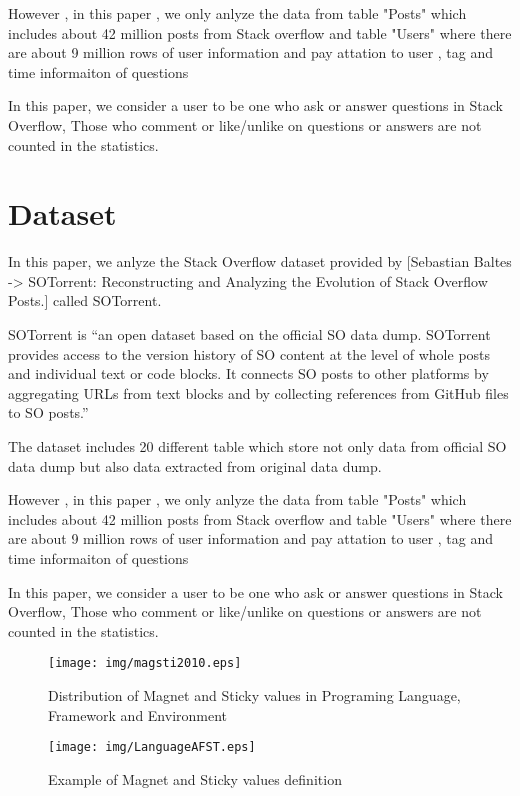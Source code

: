 \documentclass[conference]{IEEEtran}
\begin{document}
However , in this paper , we only anlyze the data from table "Posts" which includes about 42 million posts from Stack overflow and table "Users" where there are about 9 million rows of user information and pay attation to user , tag and time informaiton of questions

In this paper, we consider a user to be one who ask or answer questions in Stack Overflow, Those who comment or like/unlike on questions or answers are not counted in the statistics.

\section{Dataset}
In this paper, we anlyze the Stack Overflow dataset provided by [Sebastian Baltes -> SOTorrent: Reconstructing and Analyzing the Evolution of Stack Overflow Posts.] called SOTorrent. 

SOTorrent is “an open dataset based on the official SO data dump. SOTorrent provides access to the version history of SO content at the level of whole posts and individual text or code blocks. It connects SO posts to other platforms by aggregating URLs from text blocks and by collecting references from GitHub files to SO posts.”

The dataset includes 20 different table which store not only data from official SO data dump but also data extracted from original data dump.

However , in this paper , we only anlyze the data from table "Posts" which includes about 42 million posts from Stack overflow and table "Users" where there are about 9 million rows of user information and pay attation to user , tag and time informaiton of questions

In this paper, we consider a user to be one who ask or answer questions in Stack Overflow, Those who comment or like/unlike on questions or answers are not counted in the statistics.

\begin{figure*}[t]
 \centering
 \texttt{[image: img/magsti2010.eps]}  
 \caption{Distribution of Magnet and Sticky values in Programing Language, Framework and Environment} 
 \label{fig:plotframe2010} 
\end{figure*}

\begin{figure}[t]
 \centering
 \texttt{[image: img/LanguageAFST.eps]}  
 \caption{Example of Magnet and Sticky values definition} 
 \label{fig:example1zs} 
\end{figure}
\smallskip
\smallskip
\end{document}
